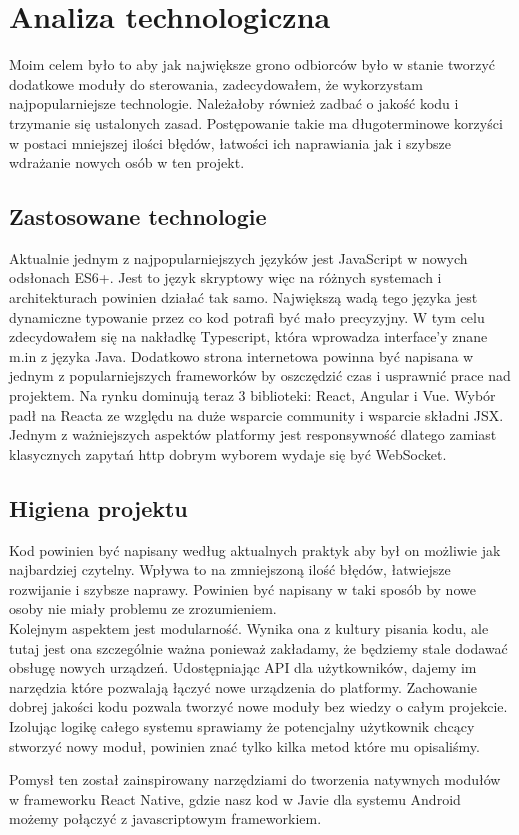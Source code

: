 \chapter{Analiza technologiczna}
Moim celem było to aby jak największe grono odbiorców było w stanie tworzyć dodatkowe moduły do sterowania, zadecydowałem, że wykorzystam najpopularniejsze technologie. Należałoby również zadbać o jakość kodu i trzymanie się ustalonych zasad. Postępowanie takie ma długoterminowe korzyści w postaci mniejszej ilości błędów, łatwości ich naprawiania jak i szybsze wdrażanie nowych osób w ten projekt.
\section{Zastosowane technologie}
Aktualnie jednym z najpopularniejszych języków jest JavaScript w nowych odsłonach ES6+. Jest to język skryptowy więc na różnych systemach i architekturach powinien działać tak samo. Największą wadą tego języka jest dynamiczne typowanie przez co kod potrafi być mało precyzyjny. W tym celu zdecydowałem się na nakładkę Typescript, która wprowadza interface'y znane m.in z języka Java. Dodatkowo strona internetowa powinna być napisana w jednym z popularniejszych frameworków by oszczędzić czas i usprawnić prace nad projektem. Na rynku dominują teraz 3 biblioteki: React, Angular i Vue. Wybór padł na Reacta ze względu na duże wsparcie community i wsparcie składni JSX. \\
Jednym z ważniejszych aspektów platformy jest responsywność dlatego zamiast klasycznych zapytań http dobrym wyborem wydaje się być WebSocket. 
\section{Higiena projektu}
Kod powinien być napisany według aktualnych praktyk aby był on możliwie jak najbardziej czytelny. Wpływa to na zmniejszoną ilość błędów, łatwiejsze rozwijanie i szybsze naprawy. Powinien być napisany w taki sposób by nowe osoby nie miały problemu ze zrozumieniem. \\
Kolejnym aspektem jest modularność. Wynika ona z kultury pisania kodu, ale tutaj jest ona szczególnie ważna ponieważ zakładamy, że będziemy stale dodawać obsługę nowych urządzeń. Udostępniając API dla użytkowników, dajemy im narzędzia które pozwalają łączyć nowe urządzenia do platformy. Zachowanie dobrej jakości kodu pozwala tworzyć nowe moduły bez wiedzy o całym projekcie. Izolując logikę całego systemu sprawiamy że potencjalny użytkownik chcący stworzyć nowy moduł, powinien znać tylko kilka metod które mu opisaliśmy. 
\par Pomysł ten został zainspirowany narzędziami do tworzenia natywnych modułów w frameworku React Native, gdzie nasz kod w Javie dla systemu Android możemy połączyć z javascriptowym frameworkiem. 